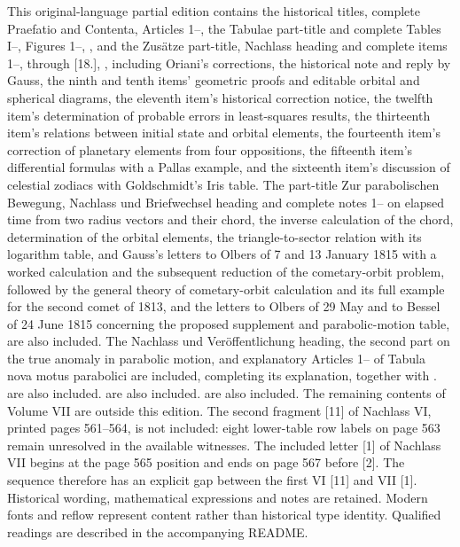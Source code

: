 This original-language partial edition contains the historical titles, complete Praefatio and Contenta, Articles 1--\GaussCurrentLastArticle, the Tabulae part-title and complete Tables I--\GaussCurrentLastTable, Figures 1--\GaussCurrentFigureCount, \GaussCurrentBemerkungenScope, and the Zusätze part-title, Nachlass heading and complete items 1--\GaussCurrentLastZusatz, through [18.], \GaussCurrentZusatzRemarksScope, including Oriani’s corrections, the historical note and reply by Gauss, the ninth and tenth items’ geometric proofs and editable orbital and spherical diagrams, the eleventh item’s historical correction notice, the twelfth item’s determination of probable errors in least-squares results, the thirteenth item’s relations between initial state and orbital elements, the fourteenth item’s correction of planetary elements from four oppositions, the fifteenth item’s differential formulas with a Pallas example, and the sixteenth item’s discussion of celestial zodiacs with Goldschmidt’s Iris table. The part-title Zur parabolischen Bewegung, Nachlass und Briefwechsel heading and complete notes 1--\GaussCurrentLastParabolicNote{} on elapsed time from two radius vectors and their chord, the inverse calculation of the chord, determination of the orbital elements, the triangle-to-sector relation with its logarithm table, and Gauss’s letters to Olbers of 7 and 13 January 1815 with a worked calculation and the subsequent reduction of the cometary-orbit problem, followed by the general theory of cometary-orbit calculation and its full example for the second comet of 1813, and the letters to Olbers of 29 May and to Bessel of 24 June 1815 concerning the proposed supplement and parabolic-motion table, are also included. The Nachlass und Veröffentlichung heading, the second part on the true anomaly in parabolic motion, and explanatory Articles 1--\GaussCurrentLastTabulaNovaArticle{} of Tabula nova motus parabolici are included, completing its explanation, together with \GaussCurrentTabulaNovaTableScope. \GaussCurrentPostTabulaNovaScope{} are also included. \GaussCurrentCeresScope{} are also included. \GaussCurrentPallasScope{} are also included. The remaining contents of Volume VII are outside this edition. The second fragment [11] of Nachlass VI, printed pages 561--564, is not included: eight lower-table row labels on page 563 remain unresolved in the available witnesses. The included letter [1] of Nachlass VII begins at the page 565 position and ends on page 567 before [2]. The sequence therefore has an explicit gap between the first VI [11] and VII [1]. Historical wording, mathematical expressions and notes are retained. Modern fonts and reflow represent content rather than historical type identity. Qualified readings are described in the accompanying README.

